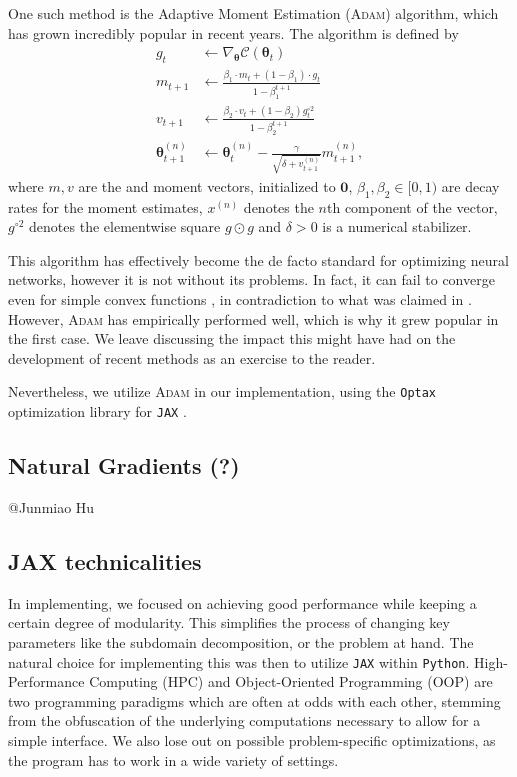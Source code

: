 One such method is the Adaptive Moment Estimation (\textsc{Adam}) \cite{kingma2017adam} algorithm, which has grown incredibly popular in recent years.
The algorithm is defined by
\begin{equation}
\begin{split}
    g_{t} &\gets \nabla_{\boldsymbol{\theta}}\mathcal{C}(\boldsymbol{\theta}_t) \\
    m_{t+1} &\gets \frac{\beta_1 \cdot m_t + (1-\beta_1) \cdot g_t}{1 - \beta_1^{t+1}} \\
    v_{t+1} &\gets \frac{\beta_2 \cdot v_t + (1 - \beta_2)g_t^{\circ 2}}{1 - \beta_2^{t+1}} \\
    \boldsymbol{\theta}_{t+1}^{(n)} &\gets \boldsymbol{\theta}_t^{(n)} - \frac{\gamma}{\sqrt{\delta + v_{t+1}^{(n)}}} m_{t+1}^{(n)},
\end{split}
\end{equation}
where $m, v$ are the  and  moment vectors, initialized to $\boldsymbol{0}$, $\beta_1, \beta_2 \in [0,1)$ are decay rates for the moment estimates, $x^{(n)}$ denotes the $n$th component of the vector, $g^{\circ 2}$ denotes the elementwise square $g \odot g$ and $\delta > 0$ is a numerical stabilizer. 

This algorithm has effectively become the de facto standard for optimizing neural networks, however it is not without its problems.
In fact, it can fail to converge even for simple convex functions \cite{reddi2019convergence}, in contradiction to what was claimed in \cite{kingma2017adam}.
However, \textsc{Adam} has empirically performed well, which is why it grew popular in the first case.
We leave discussing the impact this might have had on the development of recent methods as an exercise to the reader.

Nevertheless, we utilize \textsc{Adam} in our implementation, using the \verb|Optax| \cite{deepmind2020jax} optimization library for \verb|JAX| \cite{jax2018github}.

\subsection{Natural Gradients (?)}
@Junmiao Hu

\subsection{JAX technicalities}\label{sec:JAX}
In implementing, we focused on achieving good performance while keeping a certain degree of modularity.
This simplifies the process of changing key parameters like the subdomain decomposition, or the problem at hand.
The natural choice for implementing this was then to utilize \verb|JAX| \cite{jax2018github} within \verb|Python|.
High-Performance Computing (HPC) and Object-Oriented Programming (OOP) are two programming paradigms which are often at odds with each other, stemming from the obfuscation of the underlying computations necessary to allow for a simple interface.
We also lose out on possible problem-specific optimizations, as the program has to work in a wide variety of settings.

